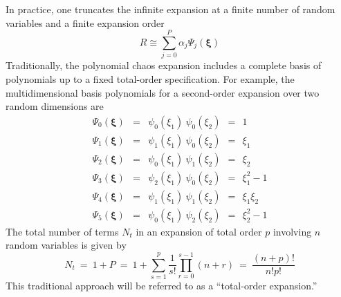 In practice, one truncates the infinite expansion at a finite number
of random variables and a finite expansion order
\begin{equation}
R \cong \sum_{j=0}^P \alpha_j \Psi_j(\boldsymbol{\xi})
\label{eq:pc_exp_trunc}
\end{equation}
Traditionally, the polynomial chaos expansion includes a complete
basis of polynomials up to a fixed total-order specification.  For
example, the multidimensional basis polynomials for a second-order
expansion over two random dimensions are
\begin{eqnarray}
\Psi_0(\boldsymbol{\xi}) & = & \psi_0(\xi_1) ~ \psi_0(\xi_2) ~~=~~ 1 
\nonumber \\
\Psi_1(\boldsymbol{\xi}) & = & \psi_1(\xi_1) ~ \psi_0(\xi_2) ~~=~~ \xi_1 
\nonumber \\
\Psi_2(\boldsymbol{\xi}) & = & \psi_0(\xi_1) ~ \psi_1(\xi_2) ~~=~~ \xi_2 
\nonumber \\
\Psi_3(\boldsymbol{\xi}) & = & \psi_2(\xi_1) ~ \psi_0(\xi_2) ~~=~~ \xi_1^2 - 1 
\nonumber \\
\Psi_4(\boldsymbol{\xi}) & = & \psi_1(\xi_1) ~ \psi_1(\xi_2) ~~=~~ \xi_1 \xi_2 
\nonumber \\
\Psi_5(\boldsymbol{\xi}) & = & \psi_0(\xi_1) ~ \psi_2(\xi_2) ~~=~~ \xi_2^2 - 1 
\nonumber 
\end{eqnarray}
The total number of terms $N_t$ in an expansion of total order
$p$ involving $n$ random variables is given by
\begin{equation}
N_t ~=~ 1 + P ~=~ 1 + \sum_{s=1}^{p} {\frac{1}{s!}} \prod_{r=0}^{s-1} (n+r)
    ~=~ \frac{(n+p)!}{n!p!} \label{eq:num_to_terms}
\end{equation}
This traditional approach will be referred to as a ``total-order
expansion.''


